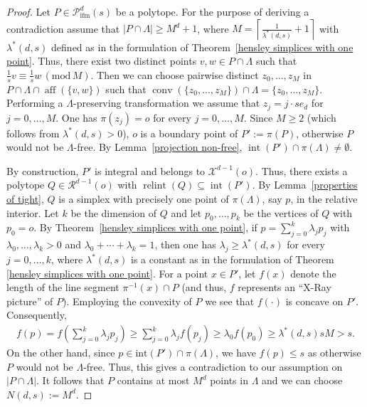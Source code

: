 \documentclass[a4paper]{article}
\theoremstyle{plain}
\begin{document}
\begin{proof}
Let $P \in {{\mathcal{P}}_{{\mathop{\mathrm{{ifm}}}}}^{{d}}({s})}$ be a polytope.
For the purpose of deriving a contradiction assume that
$|P \cap \Lambda| \ge M^d + 1$, where
$M = {\left\lceil{\frac{1}{\lambda^\ast(d,s)} + 1}\right\rceil}$ with
$\lambda^\ast(d,s)$ defined as in the formulation of
Theorem~\ref{hensley simplices with one point}.
Thus, there exist two distinct points $v, w \in
P \cap \Lambda$ such that $\frac{1}{s} v \equiv \frac{1}{s}
w {\, (\mathrm{mod} \, {M})}$.
Then we can choose pairwise distinct $z_0, \ldots, z_M$ in
$P \cap \Lambda \cap {{\mathop{\mathrm{{aff}}}}}(\{v,w\})$ such that
${{\mathop{\mathrm{{conv}}}}}(\{z_0, \ldots, z_M\}) \cap \Lambda = \{z_0, \ldots,
z_M\}$.
Performing a $\Lambda$-preserving transformation we assume
that $z_j = j \cdot s e_d$ for $j = 0, \ldots, M$.
One has $\pi(z_j) = o$ for every $j = 0, \ldots, M$.
Since $M \ge 2$ (which follows from $\lambda^\ast(d,s) > 0$), 
$o$ is a boundary point of $P' := \pi(P)$,
otherwise $P$ would not be $\Lambda$-free.
By Lemma~\ref{projection non-free}, ${{\mathop{\mathrm{{int}}}}}(P') \cap
\pi(\Lambda) \ne \emptyset$.

By construction, $P'$ is integral and belongs to
${\mathcal{X}}^{d-1}(o)$.
Thus, there exists a polytope $Q \in {\mathcal{R}}^{d-1}(o)$ with
${{\mathop{\mathrm{{relint}}}}}(Q) \subseteq {{\mathop{\mathrm{{int}}}}}(P')$.
By Lemma~\ref{properties of tight}, $Q$ is a simplex with
precisely one point of $\pi(\Lambda)$, say $p$, in the
relative interior.
Let $k$ be the dimension of $Q$ and let $p_0,\ldots,p_k$ be
the vertices of $Q$ with $p_0 = o$.
By Theorem~\ref{hensley simplices with one point}, if
$p = \sum_{j=0}^k \lambda_j p_j$ with
$\lambda_0,\ldots,\lambda_k >0$ and $\lambda_0 + \cdots +
\lambda_k = 1$, then one has $\lambda_j \ge
\lambda^\ast(d,s)$ for every $j=0,\ldots,k$, where
$\lambda^\ast(d,s)$ is a constant as in the formulation of
Theorem \ref{hensley simplices with one point}.
For a point $x \in P'$, let $f(x)$ denote the length of
the line segment $\pi^{-1}(x) \cap P$ (and thus, $f$
represents an ``X-Ray picture'' of $P$).
Employing the convexity of $P$ we see that $f(\cdot)$ is
concave on $P'$.
Consequently,
\begin{align*}
  f(p) = f\left(\sum_{j=0}^k \lambda_j p_j \right) \ge
  \sum_{j=0}^k \lambda_j f(p_j) \ge \lambda_0 f(p_0) \ge
  \lambda^\ast(d,s) s M > s.
\end{align*}
On the other hand, since $p \in {\mathrm{int}}(P') \cap
\pi(\Lambda)$, we have $f(p) \le s$ as otherwise $P$ would
not be $\Lambda$-free.
Thus, this gives a contradiction to our assumption on $|P
\cap \Lambda|$.
It follows that $P$ contains at most $M^d$ points in
$\Lambda$ and we can choose $N(d,s) := M^d$.
\end{proof}
\end{document}

